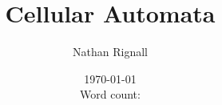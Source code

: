 \titlehead{\centering University of Hull}
\subject{600093 - Computational Science}
\title{Cellular Automata}
\author{Nathan Rignall}
\immediate{}
\date{\today\\ Word count: }
\maketitle